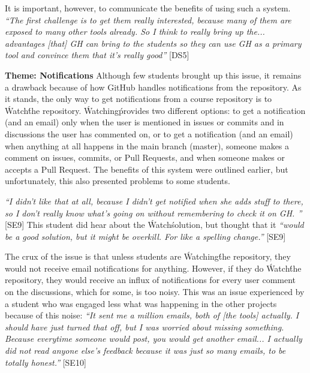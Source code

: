 It is important, however, to communicate the benefits of using such a system. \textit{``The first challenge is to get them really interested, because many of them are exposed to many other tools already. So I think to really bring up the... advantages [that] GH can bring to the students so they can use GH as a primary tool and convince them that it's really good''} [DS5]

\textbf{Theme: Notifications} \break
Although few students brought up this issue, it remains a drawback because of how GitHub handles notifications from the repository. As it stands, the only way to get notifications from a course repository is to \'Watch\' the repository. \'Watching\' provides two different options: to get a notification (and an email) only when the user is mentioned in issues or commits and in discussions the user has commented on, or to get a notification (and an email) when anything at all happens in the main branch (master), someone makes a comment on issues, commits, or Pull Requests, and when someone makes or accepts a Pull Request. The benefits of this system were outlined earlier, but unfortunately, this also presented problems to some students.

\textit{``I didn't like that at all, because I didn't get notified when she adds stuff to there, so I don't really know what's going on without remembering to check it on GH. ''} [SE9] This student did hear about the \'Watch\' solution, but thought that it \textit{``would be a good solution, but it might be overkill. For like a spelling change.''} [SE9]

The crux of the issue is that unless students are \'Watching\' the repository, they would not receive email notifications for anything. However, if they do \'Watch\' the repository, they would receive an influx of notifications for every user comment on the discussions, which for some, is too noisy. This was an issue experienced by a student who was engaged less what was happening in the other projects because of this noise: \textit{``It sent me a million emails, both of [the tools] actually. I should have just turned that off, but I was worried about missing something. Because everytime someone would post, you would get another email... I actually did not read anyone else's feedback because it was just so many emails, to be totally honest.''} [SE10]


